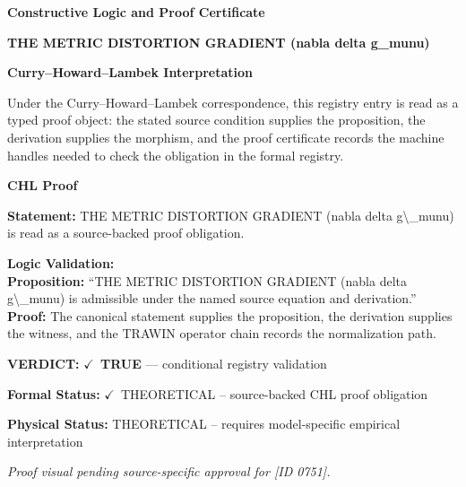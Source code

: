 \clearpage
\begingroup\tzpsupportsetup
\noindent\textbf{\fontsize{10.8pt}{12.8pt}\selectfont [ID 0751] Constructive Logic and Proof Certificate}\par
\noindent\textbf{\fontsize{10pt}{12pt}\selectfont THE METRIC DISTORTION GRADIENT (nabla delta g\_munu)}\par
\vspace{0.45em}
\begingroup
\footnotesize
\setlength{\parskip}{0.22em}
\setlength{\parindent}{0pt}
\noindent\textbf{Curry--Howard--Lambek Interpretation}\par
Under the Curry--Howard--Lambek correspondence, this registry entry is read as a typed proof
object: the stated source condition supplies the proposition, the derivation supplies the
morphism, and the proof certificate records the machine handles needed to check the obligation
in the formal registry.

\vspace{0.45em}
\noindent\textbf{CHL Proof}\par
\textbf{Statement:} THE METRIC DISTORTION GRADIENT (nabla delta g\textbackslash{}\_munu) is read as a source-backed proof obligation.

\textbf{Logic Validation:}\\
\textbf{Proposition:} ``THE METRIC DISTORTION GRADIENT (nabla delta g\textbackslash{}\_munu) is admissible under the named source equation and derivation.''\\
\textbf{Proof:} The canonical statement supplies the proposition, the derivation supplies the witness, and the TRAWIN operator chain records the normalization path.

\textbf{VERDICT:} \ensuremath{\checkmark}\ \textbf{TRUE} --- conditional registry validation

\textbf{Formal Status:} \ensuremath{\checkmark}\ THEORETICAL -- source-backed CHL proof obligation

\textbf{Physical Status:} THEORETICAL -- requires model-specific empirical interpretation
\par\vspace{0.45em}
\par
\vfill
\begingroup\footnotesize\itshape
Proof visual pending source-specific approval for [ID 0751].
\par\endgroup
\vfill
\endgroup
\endgroup
